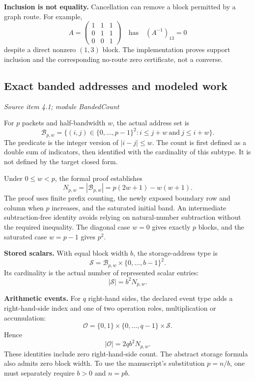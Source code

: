\textbf{Inclusion is not equality.} Cancellation can remove a block permitted by a graph route. For example,
\[
A=\begin{pmatrix}1&1&1\\0&1&1\\0&0&1\end{pmatrix}
\quad\text{has}\quad (A^{-1})_{13}=0
\]
despite a direct nonzero $(1,3)$ block. The implementation proves support inclusion and the corresponding no-route zero certificate, not a converse.



\subsection{Exact banded addresses and modeled work}\label{supp5:subsection:004}\textit{Source item 4.1; module BandedCount}\par
For $p$ packets and half-bandwidth $w$, the actual address set is
\[
\mathcal B_{p,w}
=\{(i,j)\in\{0,\ldots,p-1\}^2:
 i\leq j+w\ \text{and}\ j\leq i+w\}.
\]
The predicate is the integer version of $|i-j|\leq w$. The count is first defined as a double sum of indicators, then identified with the cardinality of this subtype. It is not defined by the target closed form.

Under $0\leq w<p$, the formal proof establishes
\[
\boxed{N_{p,w}=|\mathcal B_{p,w}|=p(2w+1)-w(w+1).}
\]
The proof uses finite prefix counting, the newly exposed boundary row and column when $p$ increases, and the saturated initial band. An intermediate subtraction-free identity avoids relying on natural-number subtraction without the required inequality. The diagonal case $w=0$ gives exactly $p$ blocks, and the saturated case $w=p-1$ gives $p^2$.

\textbf{Stored scalars.} With equal block width $b$, the storage-address type is
\[
\mathcal S=\mathcal B_{p,w}\times\{0,\ldots,b-1\}^2.
\]
Its cardinality is the actual number of represented scalar entries:
\[
\boxed{|\mathcal S|=b^2N_{p,w}.}
\]

\textbf{Arithmetic events.} For $q$ right-hand sides, the declared event type adds a right-hand-side index and one of two operation roles, multiplication or accumulation:
\[
\mathcal O=\{0,1\}\times\{0,\ldots,q-1\}\times\mathcal S.
\]
Hence
\[
\boxed{|\mathcal O|=2qb^2N_{p,w}.}
\]
These identities include zero right-hand-side count. The abstract storage formula also admits zero block width. To use the manuscript's substitution $p=n/b$, one must separately require $b>0$ and $n=pb$.

